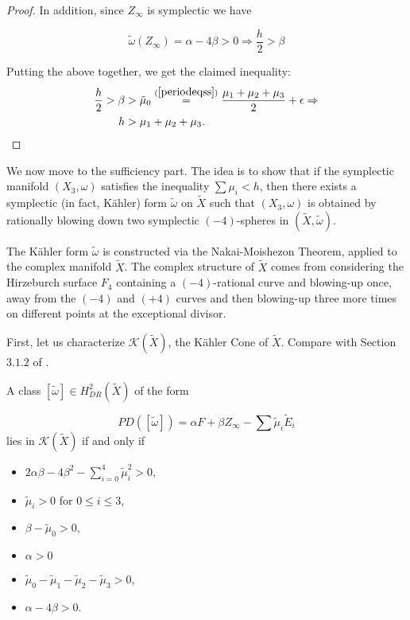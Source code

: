 \begin{proof}
 In addition, since $Z_\infty$ is symplectic we have 

\begin{equation}
    \tilde{\omega}(Z_\infty)=\alpha-4\beta>0 \Rightarrow \frac{h}{2}>\beta
\end{equation}


Putting the above together, we get the claimed inequality: 
\begin{align*}
    \frac{h}{2}>\beta&>\tilde{\mu}_0\overset{(\ref{periodeqss})}{=}\frac{\mu_1+\mu_2+\mu_3}{2}+\epsilon\Rightarrow \\
    h&>\mu_1+\mu_2+\mu_3.
\end{align*}


\end{proof}



We now move to the sufficiency part. The idea is to show that if the symplectic manifold $(X_3,\omega)$ satisfies the inequality $\sum \mu_i<h$, then there exists a symplectic (in fact, K\"ahler) form $\tilde{\omega}$ on $\tilde{X}$ such that $(X_3,\omega)$ is obtained by rationally blowing down two symplectic $(-4)$-spheres in
$(\widetilde{X},\tilde{\omega})$. \par 

The K\"ahler form $\tilde{\omega}$ is constructed via the Nakai-Moishezon Theorem, applied to the complex manifold $\widetilde{X}$. The complex structure of $\widetilde{X}$ comes from considering the Hirzeburch surface $F_4$ containing a $(-4)$-rational curve and blowing-up once, away from the $(-4)$ and $(+4)$ curves and then blowing-up three more times on different points at the exceptional divisor.\par

First, let us characterize $\mathcal{K}(\widetilde{X})$, the K\"ahler Cone of $\widetilde{X}$. Compare with Section $3.1.2$ of \cite{SS}. 
 
 
 \begin{lemma}\label{kconex5}
A class $[\tilde{\omega}]\in H^{2}_{DR}(\widetilde{X})$ of the form

\[PD([\tilde{\omega}])=\alpha F+\beta Z_\infty-\sum \tilde{\mu}_i\widetilde{E}_i\]
lies in $\mathcal{K}(\widetilde{X})$ if and only if

\begin{itemize}
    \item $2\alpha\beta-4\beta^2-\sum^4_{i=0} \tilde{\mu}^2_i>0$,
    \item $\tilde{\mu}_i>0$ for $0\leq i\leq 3$,
    \item $\beta-\tilde{\mu}_0>0$,
    \item $\alpha>0$
    \item $\tilde{\mu}_0-\tilde{\mu}_1-\tilde{\mu}_2-\tilde{\mu}_3>0$,
    \item $\alpha-4\beta>0$.
\end{itemize}
\end{lemma}

